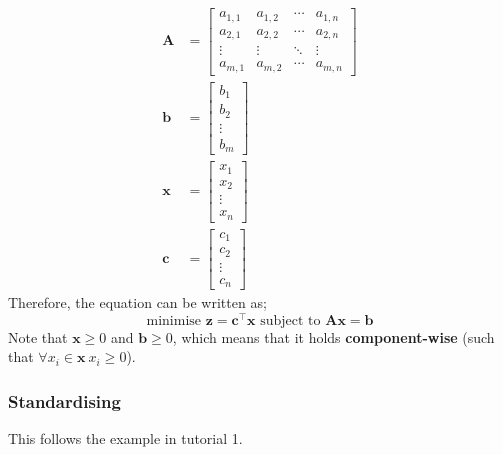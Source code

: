 \documentclass[a4paper, 12pt]{article}
\newcommand{\mat}[1]{\boldsymbol{#1}}
\renewcommand{\vec}[1]{\boldsymbol{#1}}
\begin{document}
                \begin{align*}
                    \mat{A} & = \begin{bmatrix}
                        a_{1, 1} & a_{1, 2} & \cdots & a_{1, n} \\
                        a_{2, 1} & a_{2, 2} & \cdots & a_{2, n} \\
                        \vdots & \vdots & \ddots & \vdots \\
                        a_{m ,1} & a_{m, 2} & \cdots & a_{m, n}
                    \end{bmatrix} \\
                    \vec{b} & = \begin{bmatrix}
                        b_1 \\ b_2 \\ \vdots \\ b_m
                    \end{bmatrix} \\
                    \vec{x} & = \begin{bmatrix}
                        x_1 \\ x_2 \\ \vdots \\ x_n
                    \end{bmatrix} \\
                    \vec{c} & = \begin{bmatrix}
                        c_1 \\ c_2 \\ \vdots \\ c_n
                    \end{bmatrix}
                \end{align*}
                Therefore, the equation can be written as;
                $$\text{minimise } \vec{z} = \vec{c}^\top \vec{x} \text{ subject to } \mat{A}\vec{x} = \vec{b}$$
                Note that $\vec{x} \geq 0$ and $\vec{b} \geq 0$, which means that it holds \textbf{component-wise} (such that $\forall x_i \in \vec{x}\ x_i \geq 0$).
            \subsubsection*{Standardising}
                This follows the example in tutorial 1.
                \medskip
\end{document}

